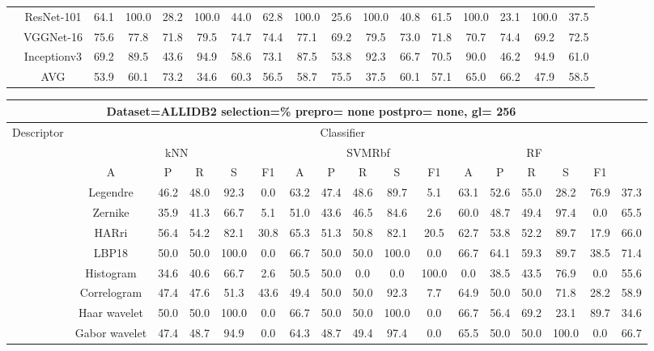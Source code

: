 \documentclass[12pt,italian]{article}
\begin{document}
\begin{tiny}
\begin{longtable}{lcccccccccccccccc}
& ResNet-101 & 64.1 & 100.0 & 28.2 & 100.0 & 44.0 & 62.8 & 100.0 & 25.6 & 100.0 & 40.8 & 61.5 & 100.0 & 23.1 & 100.0 & 37.5 \\ 
& VGGNet-16 & 75.6 & 77.8 & 71.8 & 79.5 & 74.7 & 74.4 & 77.1 & 69.2 & 79.5 & 73.0 & 71.8 & 70.7 & 74.4 & 69.2 & 72.5 \\ 
& Inceptionv3 & 69.2 & 89.5 & 43.6 & 94.9 & 58.6 & 73.1 & 87.5 & 53.8 & 92.3 & 66.7 & 70.5 & 90.0 & 46.2 & 94.9 & 61.0 \\ 
\hline
& AVG & 53.9 & 60.1 & 73.2 & 34.6 & 60.3 & 56.5 & 58.7 & 75.5 & 37.5 & 60.1 & 57.1 & 65.0 & 66.2 & 47.9 & 58.5 \\ 
\hline
\bottomrule
\end{longtable} 

 \pagebreak 
\begin{longtable}{lcccccccccccccccc}
\toprule
\multicolumn{16}{c}{Dataset=ALLIDB2 selection=\% prepro= none postpro= none, gl= 256} \\ 
\toprule
Descriptor & \multicolumn{15}{c}{Classifier} \\ 
& \multicolumn{5}{c}{kNN} & \multicolumn{5}{c}{SVMRbf} & \multicolumn{5}{c}{RF} \\ 
& A & P & R & S & F1 & A & P & R & S & F1 & A & P & R & S & F1 \\ 
\midrule
& Legendre & 46.2 & 48.0 & 92.3 &  0.0 & 63.2 & 47.4 & 48.6 & 89.7 &  5.1 & 63.1 & 52.6 & 55.0 & 28.2 & 76.9 & 37.3 \\ 
& Zernike & 35.9 & 41.3 & 66.7 &  5.1 & 51.0 & 43.6 & 46.5 & 84.6 &  2.6 & 60.0 & 48.7 & 49.4 & 97.4 &  0.0 & 65.5 \\ 
& HARri & 56.4 & 54.2 & 82.1 & 30.8 & 65.3 & 51.3 & 50.8 & 82.1 & 20.5 & 62.7 & 53.8 & 52.2 & 89.7 & 17.9 & 66.0 \\ 
& LBP18 & 50.0 & 50.0 & 100.0 &  0.0 & 66.7 & 50.0 & 50.0 & 100.0 &  0.0 & 66.7 & 64.1 & 59.3 & 89.7 & 38.5 & 71.4 \\ 
& Histogram & 34.6 & 40.6 & 66.7 &  2.6 & 50.5 & 50.0 &  0.0 &  0.0 & 100.0 &  0.0 & 38.5 & 43.5 & 76.9 &  0.0 & 55.6 \\ 
& Correlogram & 47.4 & 47.6 & 51.3 & 43.6 & 49.4 & 50.0 & 50.0 & 92.3 &  7.7 & 64.9 & 50.0 & 50.0 & 71.8 & 28.2 & 58.9 \\ 
& Haar wavelet & 50.0 & 50.0 & 100.0 &  0.0 & 66.7 & 50.0 & 50.0 & 100.0 &  0.0 & 66.7 & 56.4 & 69.2 & 23.1 & 89.7 & 34.6 \\ 
& Gabor wavelet & 47.4 & 48.7 & 94.9 &  0.0 & 64.3 & 48.7 & 49.4 & 97.4 &  0.0 & 65.5 & 50.0 & 50.0 & 100.0 &  0.0 & 66.7 \\ 

\end{longtable}
\end{tiny}
\end{document}
